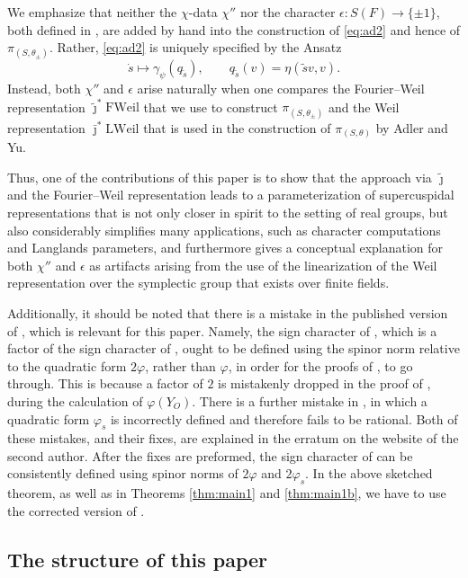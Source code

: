 \documentclass{article}
\theoremstyle{definition}
\numberwithin{equation}{subsection}
\renewcommand{\-}{\hyp{}}
\begin{document}
We emphasize that neither the $\chi$-data $\chi''$ nor the character $\epsilon : S(F) \to \{\pm1\}$, both defined in \cite{FKS23}, are added by hand into the construction of \eqref{eq:ad2} and hence of $\pi_{(S,\theta_\pm)}$. Rather, \eqref{eq:ad2} is uniquely specified by the Ansatz
\[ \dot s \mapsto \gamma_\psi(q_{\tilde s}),\qquad q_{\tilde s}(v)=\eta(\tilde sv,v) . \]
Instead, both $\chi''$ and $\epsilon$ arise naturally when one compares the Fourier--Weil representation $\tilde\jmath^*\mathrm{FWeil}$ that we use to construct $\pi_{(S,\theta_\pm)}$ and the Weil representation $\bar\jmath^*\mathrm{LWeil}$ that is used in the construction of $\pi_{(S,\theta)}$ by Adler and Yu.

Thus, one of the contributions of this paper is to show that the approach via $\tilde\jmath$ and the Fourier--Weil representation leads to a parameterization of supercuspidal representations that is not only closer in spirit to the setting of real groups, but also considerably simplifies many applications, such as character computations and Langlands parameters, and furthermore gives a conceptual explanation for both $\chi''$ and $\epsilon$ as artifacts arising from the use of the linearization of the Weil representation over the symplectic group that exists over finite fields. 


Additionally, it should be noted that there is a mistake in the published version of \cite{FKS23}, which is relevant for this paper. Namely, the sign character of \cite[Definition 5.5.7]{FKS23}, which is a factor of the sign character of \cite[Definition 5.5.8]{FKS23}, ought to be defined using the spinor norm relative to the quadratic form $2\varphi$, rather than $\varphi$, in order for the proofs of \cite[Proposition 5.5.9, Theorem 3.4]{FKS23}, to go through. This is because a factor of $2$ is mistakenly dropped in the proof of \cite[Proposition 5.5.9]{FKS23}, during the calculation of $\varphi(Y_O)$. There is a further mistake in \cite[Remark 5.5.10]{FKS23}, in which a quadratic form $\varphi_s$ is incorrectly defined and therefore fails to be rational. Both of these mistakes, and their fixes, are explained in the erratum on the website of the second author. After the fixes are preformed, the sign character of \cite[Definition 5.5.8]{FKS23} can be consistently defined using spinor norms of $2\varphi$ and $2\varphi_s$. In the above sketched theorem, as well as in Theorems \ref{thm:main1} and \ref{thm:main1b}, we have to use the corrected version of \cite[Definition 5.5.8]{FKS23}.

\subsection{The structure of this paper}
\end{document}
